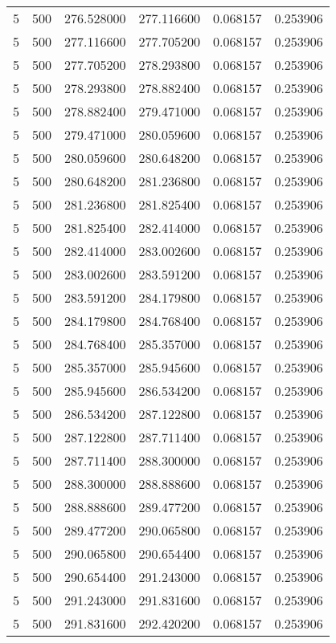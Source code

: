 \begin{longtable}{rrrrrr}
5 & 500 & 276.528000 & 277.116600 & 0.068157 & 0.253906 \\
5 & 500 & 277.116600 & 277.705200 & 0.068157 & 0.253906 \\
5 & 500 & 277.705200 & 278.293800 & 0.068157 & 0.253906 \\
5 & 500 & 278.293800 & 278.882400 & 0.068157 & 0.253906 \\
5 & 500 & 278.882400 & 279.471000 & 0.068157 & 0.253906 \\
5 & 500 & 279.471000 & 280.059600 & 0.068157 & 0.253906 \\
5 & 500 & 280.059600 & 280.648200 & 0.068157 & 0.253906 \\
5 & 500 & 280.648200 & 281.236800 & 0.068157 & 0.253906 \\
5 & 500 & 281.236800 & 281.825400 & 0.068157 & 0.253906 \\
5 & 500 & 281.825400 & 282.414000 & 0.068157 & 0.253906 \\
5 & 500 & 282.414000 & 283.002600 & 0.068157 & 0.253906 \\
5 & 500 & 283.002600 & 283.591200 & 0.068157 & 0.253906 \\
5 & 500 & 283.591200 & 284.179800 & 0.068157 & 0.253906 \\
5 & 500 & 284.179800 & 284.768400 & 0.068157 & 0.253906 \\
5 & 500 & 284.768400 & 285.357000 & 0.068157 & 0.253906 \\
5 & 500 & 285.357000 & 285.945600 & 0.068157 & 0.253906 \\
5 & 500 & 285.945600 & 286.534200 & 0.068157 & 0.253906 \\
5 & 500 & 286.534200 & 287.122800 & 0.068157 & 0.253906 \\
5 & 500 & 287.122800 & 287.711400 & 0.068157 & 0.253906 \\
5 & 500 & 287.711400 & 288.300000 & 0.068157 & 0.253906 \\
5 & 500 & 288.300000 & 288.888600 & 0.068157 & 0.253906 \\
5 & 500 & 288.888600 & 289.477200 & 0.068157 & 0.253906 \\
5 & 500 & 289.477200 & 290.065800 & 0.068157 & 0.253906 \\
5 & 500 & 290.065800 & 290.654400 & 0.068157 & 0.253906 \\
5 & 500 & 290.654400 & 291.243000 & 0.068157 & 0.253906 \\
5 & 500 & 291.243000 & 291.831600 & 0.068157 & 0.253906 \\
5 & 500 & 291.831600 & 292.420200 & 0.068157 & 0.253906 \\

\end{longtable}
